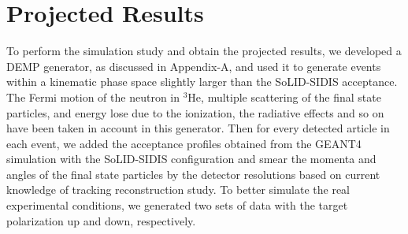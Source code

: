 \section{Projected Results}

To perform the simulation study and obtain the projected results, we developed
a DEMP generator, as discussed in Appendix-A, and used it to generate events
within a kinematic phase space slightly larger than the SoLID-SIDIS acceptance.
The Fermi motion of the neutron in $\mathrm{^{3}He}$, multiple scattering of
the final state particles, and energy lose due to the ionization, the radiative
effects and so on have been taken in account in this generator.  Then for every
detected article in each event, we added the acceptance profiles obtained from
the GEANT4 simulation with the SoLID-SIDIS configuration and smear the momenta
and angles of the final state particles by the detector resolutions based on
current knowledge of tracking reconstruction study. To better simulate the real
experimental conditions, we generated two sets of data with the target
polarization up and down, respectively.

